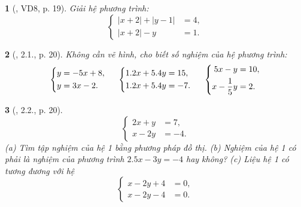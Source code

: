 \documentclass{article}
\newtheorem{baitoan}{}
\begin{document}
\begin{baitoan}[\cite{Binh_boi_duong_Toan_9_tap_2}, VD8, p. 19]
	Giải hệ phương trình:
	\begin{equation*}
		\left\{\begin{split}
			|x + 2| + |y - 1| &= 4,\\
			|x + 2| - y &= 1.
		\end{split}\right.
	\end{equation*}
\end{baitoan}

\begin{baitoan}[\cite{Binh_boi_duong_Toan_9_tap_2}, 2.1., p. 20]
	Không cần vẽ hình, cho biết số nghiệm của hệ phương trình:
	\begin{equation*}
		\left\{\begin{split}
			y &= -5x + 8,\\
			y &= 3x - 2.
		\end{split}\right.\hspace{5mm}
		\left\{\begin{split}
			1.2x + 5.4y &= 15,\\
			1.2x + 5.4y &= -7.
		\end{split}\right.\hspace{5mm}
		\left\{\begin{split}
		5x - y &= 10,\\
		x - \frac{1}{5}y &= 2.
		\end{split}\right.
	\end{equation*}
\end{baitoan}

\begin{baitoan}[\cite{Binh_boi_duong_Toan_9_tap_2}, 2.2., p. 20]
	\begin{equation*}
		\left\{\begin{split}
			2x + y &= 7,\\
			x - 2y &= -4.
		\end{split}\right.
	\end{equation*}
	(a) Tìm tập nghiệm của hệ 1 bằng phương pháp đồ thị. (b) Nghiệm của hệ 1 có phải là nghiệm của phương trình $2.5x - 3y = -4$ hay không? (c) Liệu hệ 1 có tương đương với hệ
	\begin{equation*}
		\left\{\begin{split}
			x - 2y + 4 &= 0,\\
			x - 2y - 4 &= 0.
		\end{split}\right.
	\end{equation*}
\end{baitoan}
\end{document}
